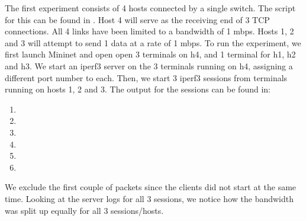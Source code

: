 The first experiment consists of 4 hosts connected by a single switch. The script for this can be found in . Host 4 will serve as the receiving end of 3 TCP connections. All 4 links have been limited to a bandwidth of 1 mbps. Hosts 1, 2 and 3 will attempt to send 1 data at a rate of 1 mbps. To run the experiment, we first launch Mininet and open open 3 terminals on h4, and 1 terminal for h1, h2 and h3. We start an iperf3 server on the 3 terminals running on h4, assigning a different port number to each. Then, we start 3 iperf3 sessions from terminals running on hosts 1, 2 and 3. The output for the sessions can be found in:
\begin{enumerate}
    \item {}
    \item {}
    \item {}
    \item {}
    \item {}
    \item {}
\end{enumerate}

We exclude the first couple of packets since the clients did not start at the same time. Looking at the server logs for all 3 sessions, we notice how the bandwidth was split up equally for all 3 sessions/hosts.